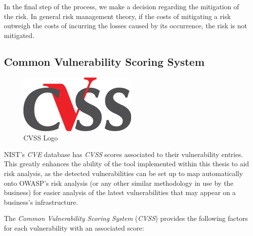 \documentclass[a4paper,12pt]{article}
\begin{document}
	In the final step of the process, we make a decision regarding the mitigation of the risk. In general risk management theory, if the costs of mitigating a risk outweigh the costs of incurring the losses caused by its occurrence, the risk is not mitigated.
	
\subsection{Common Vulnerability Scoring System} \label{cvss}
 
	
	\begin{figure}
		\vspace{-10pt}
		\centering
		\includegraphics[scale=0.4]{cvss.png}
		\caption[Common Vulnerability Scoring System logo]{CVSS Logo\cite{cvssv2}}
	\end{figure}
	
	NIST's \textit{CVE} database has \textit{CVSS} scores associated to their vulnerability entries. This greatly enhances the ability of the tool implemented within this thesis to aid risk analysis, as the detected vulnerabilities can be set up to map automatically onto OWASP's risk analysis (or any other similar methodology in use by the business) for easier analysis of the latest vulnerabilities that may appear on a business's infrastructure.
	
	The \textit{Common Vulnerability Scoring System}\cite{cvssv2} (\textit{CVSS}) provides the following factors for each vulnerability with an associated score:
	
\end{document}
